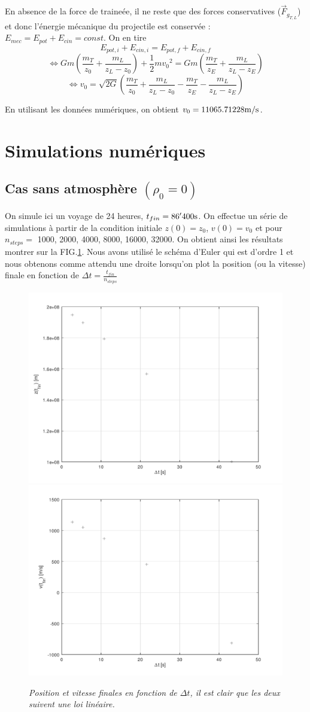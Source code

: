 \documentclass[a4paper,12pt,twoside]{article}
\def \be {\begin{equation}}
\def \ee {\end{equation}}
\begin{document}
En absence de la force de traineée, il ne reste que des forces conservatives ($\vec{F}_{g_{T,L}}$) et donc l'énergie mécanique du projectile est conservée : $E_{mec} = E_{pot} + E_{cin} = const$. On en tire 
\[ E_{pot,i} + E_{cin,i} = E_{pot,f} + E_{cin,f} \]
\[ \Leftrightarrow Gm(\frac{m_T}{z_0}+\frac{m_L}{z_L-z_0})+\frac{1}{2}m{v_0}^2 = Gm(\frac{m_T}{z_E}+\frac{m_L}{z_L-z_E})\]
\be \Leftrightarrow v_0= \sqrt{2G}(\frac{m_T}{z_0}+\frac{m_L}{z_L-z_0}-\frac{m_T}{z_E}-\frac{m_L}{z_L-z_E}) \ee

En utilisant les données numériques, on obtient $v_0=11065.71228 \rm m/s$.

\section{Simulations numériques}
\subsection{Cas sans atmosphère $(\rho_0=0)$}
On simule ici un voyage de 24 heures, $t_{fin}=86'400\rm s$. On effectue un série de simulations à partir de la condition initiale $z(0)=z_0$, $v(0)=v_0$ et pour $n_{steps}=$ 1000, 2000, 4000, 8000, 16000, 32000. On obtient ainsi les résultats montrer sur la FIG.\ref{convSans}. Nous avons utilisé le schéma d'Euler qui est d'ordre 1 et nous obtenons comme attendu une droite lorsqu'on plot la position (ou la vitesse) finale en fonction de $\Delta t = \frac{t_{fin}}{n_{steps}}$
\begin{figure} %
\begin{center}
\includegraphics[width=0.49 \textwidth]{../q1_3_a/convPsans}
\includegraphics[width=0.49 \textwidth]{../q1_3_a/convVsans}
\end{center}
\caption{\em \label{convSans} Position et vitesse finales en fonction de $\Delta t$, il est clair que les deux suivent une loi linéaire.}
\end{figure} %
\end{document}
